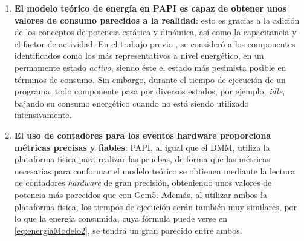 \begin{enumerate}%
    \item \textbf{El modelo teórico de energía en PAPI es capaz de obtener unos valores de consumo parecidos a la realidad}: esto es gracias a la adición de los conceptos de potencia estática y dinámica, así como la capacitancia y el factor de actividad. En el trabajo previo \cite{antoniomateo}, se consideró a los componentes identificados como los más representativos a nivel energético, en un permamente estado \emph{activo}, siendo éste el estado más pesimista posible en términos de consumo. Sin embargo, durante el tiempo de ejecución de un programa, todo componente pasa por diversos estados, por ejemplo, \textit{idle}, bajando su consumo energético cuando no está siendo utilizado intensivamente. 
    
    \item \textbf{El uso de contadores para los eventos hardware proporciona métricas precisas y fiables}: PAPI, al igual que el DMM, utiliza la plataforma física para realizar las pruebas, de forma que las métricas necesarias para conformar el modelo teórico se obtienen mediante la lectura de contadores \textit{hardware} de gran precisión, obteniendo unos valores de potencia más parecidos que con Gem5. Además, al utilizar ambos la plataforma física, los tiempos de ejecución serán también muy similares, por lo que la energía consumida, cuya fórmula puede verse en \ref{eq:energiaModelo2}, se tendrá un gran parecido entre ambos.
\end{enumerate}

\clearpage